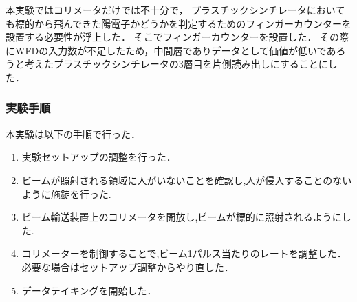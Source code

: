本実験ではコリメータだけでは不十分で，
プラスチックシンチレータにおいても標的から飛んできた陽電子かどうかを判定するためのフィンガーカウンターを設置する必要性が浮上した．
そこでフィンガーカウンターを設置した．
その際にWFDの入力数が不足したため，中間層でありデータとして価値が低いであろうと考えたプラスチックシンチレータの3層目を片側読み出しにすることにした．

\subsubsection{実験手順}
本実験は以下の手順で行った．
\begin{enumerate}
  \item 実験セットアップの調整を行った．
  \item ビームが照射される領域に人がいないことを確認し,人が侵入することのないように施錠を行った.
  \item ビーム輸送装置上のコリメータを開放し,ビームが標的に照射されるようにした.%
  \item コリメーターを制御することで,ビーム1パルス当たりのレートを調整した．
    \\必要な場合はセットアップ調整からやり直した．
  \item データテイキングを開始した．
\end{enumerate}
%
